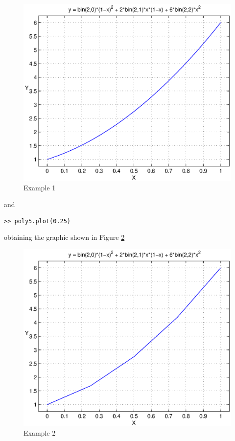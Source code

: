 \documentclass[a4paper,10pt]{report}
\begin{document}
\begin{enumerate}
\begin{figure}[h!]
 \centering
 \includegraphics[scale=0.7]{./figure1.eps}
\caption{Example 1}\label{fig:1}
\end{figure}

and
\begin{verbatim}
>> poly5.plot(0.25)
\end{verbatim}
obtaining the graphic shown in Figure \ref{fig:2}
\begin{figure}[t]
 \centering
 \includegraphics[scale=0.7]{./figure2.eps}
\caption{Example 2}\label{fig:2}
\end{figure}

\end{enumerate}
\end{document}
